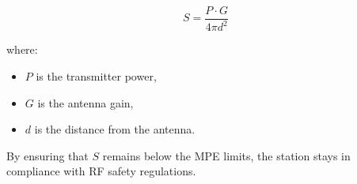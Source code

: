 \[ S = \frac{P \cdot G}{4 \pi d^2} \]

where:
\begin{itemize}
    \item \( P \) is the transmitter power,
    \item \( G \) is the antenna gain,
    \item \( d \) is the distance from the antenna.
\end{itemize}

By ensuring that \( S \) remains below the MPE limits, the station stays in compliance with RF safety regulations.

